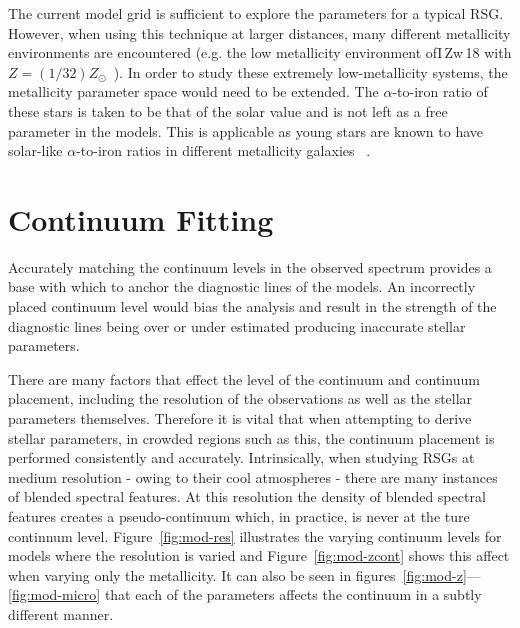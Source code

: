 The current model grid is sufficient to explore the parameters for a typical RSG.
However, when using this technique at larger distances,
many different metallicity environments are encountered (e.g. the low metallicity environment ofI\,Zw\,18 with $Z=(1/32)Z_{\odot}$~\citep{1998ApJ...508..248V}).
In order to study these extremely low-metallicity systems,
the metallicity parameter space would need to be extended.
The $\alpha$-to-iron ratio of these stars is taken to be that of the solar value and is not left as a free parameter in the models.
This is applicable as young stars are known to have solar-like $\alpha$-to-iron ratios in different metallicity galaxies
~\citep[see tables 3 and 4 in][and references therein]{2015ApJ...806...21D}.

\section{Continuum Fitting} %
\label{sub:continuum_fitting}

Accurately matching the continuum levels in the observed
spectrum provides a base with which to anchor the diagnostic lines of the models.
An incorrectly placed continuum level would bias the analysis and result in the
strength of the diagnostic lines being over or under estimated producing inaccurate stellar parameters.

There are many factors that effect the level of the continuum and continuum placement,
including the resolution of the observations as well as the stellar parameters themselves.
Therefore it is vital that when attempting to derive stellar parameters,
in crowded regions such as this, the continuum placement is performed
consistently and accurately.
Intrinsically, when studying RSGs at medium resolution - owing  to their cool atmospheres -
there are many instances of blended spectral features.
At this resolution the density of blended spectral features creates a pseudo-continuum which, in practice,
is never at the ture continnum level.
Figure~\ref{fig:mod-res} illustrates the varying continuum levels for models where the resolution is varied and
Figure~\ref{fig:mod-zcont} shows this affect when varying only the metallicity.
It can also be seen in figures~\ref{fig:mod-z}---\ref{fig:mod-micro} that each of the parameters affects the continuum in a subtly different manner.

